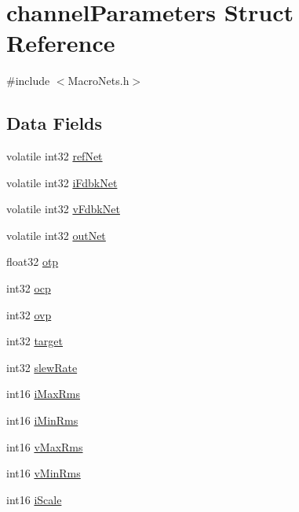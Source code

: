 \hypertarget{structchannel_parameters}{\section{channel\-Parameters Struct Reference}
\label{structchannel_parameters}
}


{\ttfamily \#include $<$Macro\-Nets.\-h$>$}

\subsection*{Data Fields}
\begin{DoxyCompactItemize}
\item 
volatile int32 \hyperlink{structchannel_parameters_a8e3dbb10da7b72b7b4fe6c200fbb495c}{ref\-Net}
\item 
volatile int32 \hyperlink{structchannel_parameters_ad4f53b220d97af172b01f1a6d57a9635}{i\-Fdbk\-Net}
\item 
volatile int32 \hyperlink{structchannel_parameters_a5b3f0afc0e3ef0bc0726ee695570e787}{v\-Fdbk\-Net}
\item 
volatile int32 \hyperlink{structchannel_parameters_ae9a6e93b8f7d8554dd06269339167215}{out\-Net}
\item 
float32 \hyperlink{structchannel_parameters_a458c22593d95ea92268aeabe975f6f66}{otp}
\item 
int32 \hyperlink{structchannel_parameters_a95bd86963045f10f75c656956a09858c}{ocp}
\item 
int32 \hyperlink{structchannel_parameters_aefb9a7e765e361d08e0ae0bbc352e244}{ovp}
\item 
int32 \hyperlink{structchannel_parameters_a2d9b0f07810affea40c8502613b8984e}{target}
\item 
int32 \hyperlink{structchannel_parameters_a09eb121ecb75a652f7689869d1685a30}{slew\-Rate}
\item 
int16 \hyperlink{structchannel_parameters_ab4b8dda9d3ab4395a3fde8bc0e403212}{i\-Max\-Rms}
\item 
int16 \hyperlink{structchannel_parameters_a12f6946f5b0ee1235d7edcb6a22a4518}{i\-Min\-Rms}
\item 
int16 \hyperlink{structchannel_parameters_a21e56dc9f903bbea9c980648a8ffc097}{v\-Max\-Rms}
\item 
int16 \hyperlink{structchannel_parameters_af6a4d30899a436a77b24b99baa2852f6}{v\-Min\-Rms}
\item 
int16 \hyperlink{structchannel_parameters_a022031c9e8a34b37c6cd05d8d7934a13}{i\-Scale}

\end{DoxyCompactItemize}
